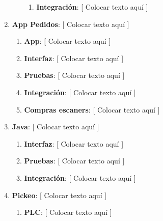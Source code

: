 \documentclass{article}
\begin{document}
\begin{enumerate}
\begin{enumerate}[label*=\arabic*.]
\begin{enumerate}[label*=\arabic*.]
						\item \textbf{Integración}: [ Colocar texto aquí ]

					\end{enumerate}

			\end{enumerate}

		\item \textbf{App Pedidos}: [ Colocar texto aquí ]

			\begin{enumerate}[label*=\arabic*.]

				\item \textbf{App}: [ Colocar texto aquí ]
			
				\item \textbf{Interfaz}: [ Colocar texto aquí ]

				\item \textbf{Pruebas}: [ Colocar texto aquí ]

				\item \textbf{Integración}: [ Colocar texto aquí ]

				\item \textbf{Compras escaners}: [ Colocar texto aquí ]

			\end{enumerate}

		\item \textbf{Java}: [ Colocar texto aquí ]

			\begin{enumerate}[label*=\arabic*.]

				\item \textbf{Interfaz}: [ Colocar texto aquí ]
			
				\item \textbf{Pruebas}: [ Colocar texto aquí ]

				\item \textbf{Integración}: [ Colocar texto aquí ]

			\end{enumerate}

		\item \textbf{Pickeo}: [ Colocar texto aquí ]

			\begin{enumerate}[label*=\arabic*.]

				\item \textbf{PLC}: [ Colocar texto aquí ]

					\begin{enumerate}[label*=\arabic*.]
						\itemsep=3pt \topsep=0pt \partopsep=0pt \parskip=0pt \parsep=0pt


\end{enumerate}
\end{enumerate}
\end{enumerate}
\end{document}
